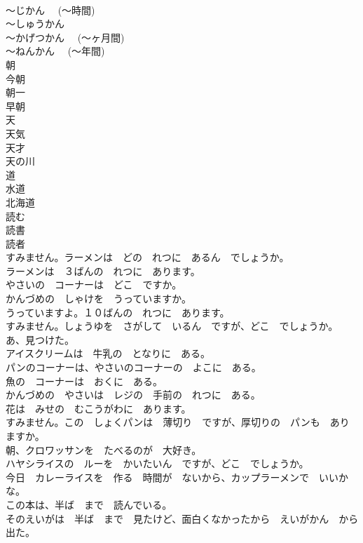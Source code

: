 \documentclass[8pt]{extreport}
\begin{document}
\begin{CJK}{UTF8}{min}
\\	～じかん　 (～時間)	
\\	～しゅうかん	
\\	～かげつかん　 (～ヶ月間)	
\\	～ねんかん　 (～年間)	
\\	朝	
\\	今朝	
\\	朝一	
\\	早朝	
\\	天	
\\	天気	
\\	天才	
\\	天の川	
\\	道	
\\	水道	
\\	北海道	
\\	読む	
\\	読書	
\\	読者	
\\	すみません。ラーメンは　どの　れつに　あるん　でしょうか。	
\\	ラーメンは　３ばんの　れつに　あります。	
\\	やさいの　コーナーは　どこ　ですか。	
\\	かんづめの　しゃけを　うっていますか。	
\\	うっていますよ。１０ばんの　れつに　あります。	
\\	すみません。しょうゆを　さがして　いるん　ですが、どこ　でしょうか。	
\\	あ、見つけた。	
\\	アイスクリームは　牛乳の　となりに　ある。	
\\	パンのコーナーは、やさいのコーナーの　よこに　ある。	
\\	魚の　コーナーは　おくに　ある。	
\\	かんづめの　やさいは　レジの　手前の　れつに　ある。	
\\	花は　みせの　むこうがわに　あります。	
\\	すみません。この　しょくパンは　薄切り　ですが、厚切りの　パンも　ありますか。	
\\	朝、クロワッサンを　たべるのが　大好き。	
\\	ハヤシライスの　ルーを　かいたいん　ですが、どこ　でしょうか。	
\\	今日　カレーライスを　作る　時間が　ないから、カップラーメンで　いいかな。	
\\	この本は、半ば　まで　読んでいる。	
\\	そのえいがは　半ば　まで　見たけど、面白くなかったから　えいがかん　から　出た。	

\end{CJK}
\end{document}
